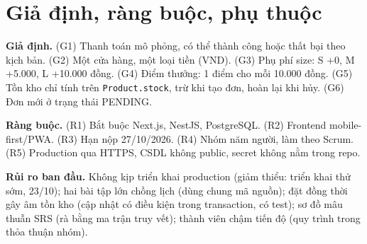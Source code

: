 \section{Giả định, ràng buộc, phụ thuộc}\label{sec:se-rangbuoc}
\textbf{Giả định.} (G1) Thanh toán mô phỏng, có thể thành công hoặc thất bại theo kịch bản. (G2) Một cửa hàng, một loại tiền (VND). (G3) Phụ phí size: S +0, M +5.000, L +10.000 đồng. (G4) Điểm thưởng: 1 điểm cho mỗi 10.000 đồng. (G5) Tồn kho chỉ tính trên \texttt{Product.stock}, trừ khi tạo đơn, hoàn lại khi hủy. (G6) Đơn mới ở trạng thái PENDING.

\textbf{Ràng buộc.} (R1) Bắt buộc Next.js, NestJS, PostgreSQL. (R2) Frontend mobile-first/PWA. (R3) Hạn nộp 27/10/2026. (R4) Nhóm năm người, làm theo Scrum. (R5) Production qua HTTPS, CSDL không public, secret không nằm trong repo.

\textbf{Rủi ro ban đầu.} Không kịp triển khai production (giảm thiểu: triển khai thử sớm, 23/10); hai bài tập lớn chồng lịch (dùng chung mã nguồn); đặt đồng thời gây âm tồn kho (cập nhật có điều kiện trong transaction, có test); sơ đồ mâu thuẫn SRS (rà bằng ma trận truy vết); thành viên chậm tiến độ (quy trình trong thỏa thuận nhóm).

